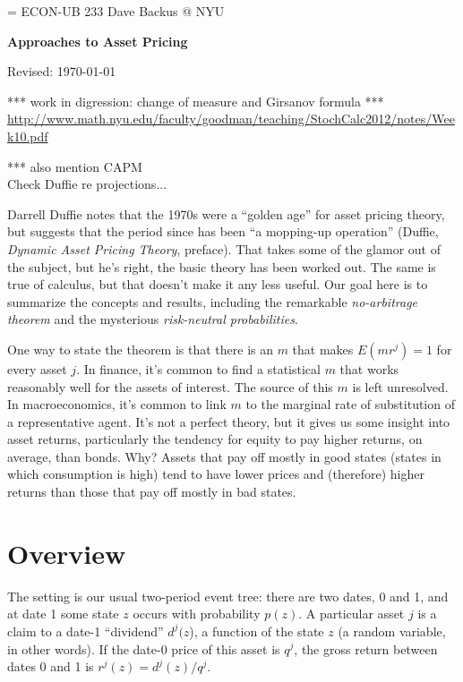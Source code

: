 \documentclass[11pt]{article}
\begin{document}
\parskip=\bigskipamount
\parindent=0.0in
\thispagestyle{empty}
{\large ECON-UB 233 \hfill Dave Backus @ NYU}

\bigskip\bigskip
\centerline{\Large \bf Approaches to Asset Pricing}
\centerline{Revised: \today}


*** work in digression:  change of measure and Girsanov formula ***
\url{http://www.math.nyu.edu/faculty/goodman/teaching/StochCalc2012/notes/Week10.pdf}


*** also mention CAPM \\
Check Duffie re projections...

\bigskip
Darrell Duffie notes that the 1970s were a ``golden age''
for asset pricing theory,
but suggests that the period since has been ``a mopping-up operation''
(Duffie, {\it Dynamic Asset Pricing Theory\/}, preface).
That takes some of the glamor out of the subject,
but he's right, the basic theory has been worked out.
The same is true of calculus, but that doesn't make it any less useful.
Our goal here is to summarize the concepts and results,
including the remarkable {\it no-arbitrage theorem\/} and
the mysterious {\it risk-neutral probabilities\/}.

One way to state the theorem is that there is an $m$ that makes
$E(mr^j) = 1$ for every asset $j$.
In finance, it's common to find a statistical $m$ that works reasonably well
for the assets of interest.
The source of this $m$ is left unresolved.
In macroeconomics, it's common to link $m$ to the marginal rate of substitution
of a representative agent.
It's not a perfect theory, but it gives us some insight into asset returns,
particularly the tendency for equity to pay higher returns, on average,
than bonds.
Why?
Assets that pay off mostly in good states (states in which consumption is high)
tend to have lower prices and (therefore) higher returns than those that pay off mostly in bad states.


\section{Overview}

The setting is our usual two-period event tree:
there are two dates, 0 and 1,
and at date 1 some state $z$ occurs with probability $p(z)$.
A particular asset $j$ is a claim to a date-1 ``dividend'' $d^j(z$),
a function of the state $z$ (a random variable, in other words).
If the date-0 price of this asset is $q^j$,
the gross return between dates 0 and 1 is $r^j(z) = d^j(z) / q^j$.
\end{document}
